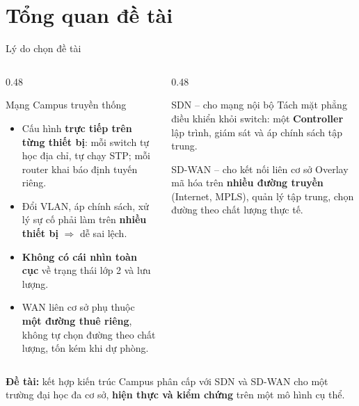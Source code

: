 \documentclass[aspectratio=169, 10pt, xcolor={table}]{beamer}
\newcommand{\compactlist}{\setlength{\itemsep}{1pt}\setlength{\parskip}{0pt}}
\begin{document}
\section{Tổng quan đề tài}

\begin{frame}{Lý do chọn đề tài}
    \begin{columns}[T]
        \begin{column}{0.48\textwidth}
            \begin{card}[badRed]{Mạng Campus truyền thống}
                \footnotesize
                \begin{itemize}\compactlist
                    \item Cấu hình \textbf{trực tiếp trên từng thiết bị}: mỗi switch tự học địa chỉ, tự chạy STP; mỗi router khai báo định tuyến riêng.
                    \item Đổi VLAN, áp chính sách, xử lý sự cố phải làm trên \textbf{nhiều thiết bị} $\Rightarrow$ dễ sai lệch.
                    \item \textbf{Không có cái nhìn toàn cục} về trạng thái lớp 2 và lưu lượng.
                    \item WAN liên cơ sở phụ thuộc \textbf{một đường thuê riêng}, không tự chọn đường theo chất lượng, tốn kém khi dự phòng.
                \end{itemize}
            \end{card}
        \end{column}
        \begin{column}{0.48\textwidth}
            \begin{card}{SDN -- cho mạng nội bộ}
                \footnotesize
                Tách mặt phẳng điều khiển khỏi switch: một \textbf{Controller} lập trình, giám sát và áp chính sách tập trung.
            \end{card}
            \begin{card}[accent]{SD-WAN -- cho kết nối liên cơ sở}
                \footnotesize
                Overlay mã hóa trên \textbf{nhiều đường truyền} (Internet, MPLS), quản lý tập trung, chọn đường theo chất lượng thực tế.
            \end{card}
        \end{column}
    \end{columns}
    \vspace{0.05cm}
    \begin{softcard}[okSoft]\footnotesize
        \textbf{\color{okGreen}Đề tài:} kết hợp kiến trúc Campus phân cấp với SDN và SD-WAN cho một trường đại học đa cơ sở,
        \textbf{hiện thực và kiểm chứng} trên một mô hình cụ thể.
    \end{softcard}
\end{frame}
\end{document}
